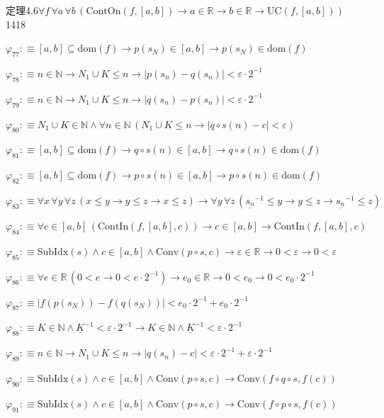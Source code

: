 \begin{fullproof}{定理4.6}{$\forall f\,\forall a\,\forall b\,(\mathrm{ContOn}(f,[a,b]) \to a \in \mathbb{R} \to b \in \mathbb{R} \to \mathrm{UC}(f,[a,b]))$}{1418}
\begin{abbrevlist}
\item $\varphi_{77} :\equiv [a,b] \subseteq \mathrm{dom}(f) \to p(s_{N}) \in [a,b] \to p(s_{N}) \in \mathrm{dom}(f)$
\item $\varphi_{78} :\equiv n \in \mathbb{N} \to N_{1} \cup K \leq n \to \lvert p(s_{n}) - q(s_{n}) \rvert < \varepsilon \cdot 2^{-1}$
\item $\varphi_{79} :\equiv n \in \mathbb{N} \to N_{1} \cup K \leq n \to \lvert q(s_{n}) - p(s_{n}) \rvert < \varepsilon \cdot 2^{-1}$
\item $\varphi_{80} :\equiv N_{1} \cup K \in \mathbb{N} \land \forall n \in \mathbb{N}\,(N_{1} \cup K \leq n \to \lvert q \circ s(n) - c \rvert < \varepsilon)$
\item $\varphi_{81} :\equiv [a,b] \subseteq \mathrm{dom}(f) \to q \circ s(n) \in [a,b] \to q \circ s(n) \in \mathrm{dom}(f)$
\item $\varphi_{82} :\equiv [a,b] \subseteq \mathrm{dom}(f) \to p \circ s(n) \in [a,b] \to p \circ s(n) \in \mathrm{dom}(f)$
\item $\varphi_{83} :\equiv \forall x\,\forall y\,\forall z\,(x \leq y \to y \leq z \to x \leq z) \to \forall y\,\forall z\,(\underline{s_{n}}^{-1} \leq y \to y \leq z \to \underline{s_{n}}^{-1} \leq z)$
\item $\varphi_{84} :\equiv \forall c \in [a,b]\,(\mathrm{ContIn}(f,[a,b],c)) \to c \in [a,b] \to \mathrm{ContIn}(f,[a,b],c)$
\item $\varphi_{85} :\equiv \mathrm{SubIdx}(s) \land c \in [a,b] \land \mathrm{Conv}(p \circ s,c) \to \varepsilon \in \mathbb{R} \to 0 < \varepsilon \to 0 < \varepsilon$
\item $\varphi_{86} :\equiv \forall e \in \mathbb{R}\,(0 < e \to 0 < e \cdot 2^{-1}) \to e_{0} \in \mathbb{R} \to 0 < e_{0} \to 0 < e_{0} \cdot 2^{-1}$
\item $\varphi_{87} :\equiv \lvert f(p(s_{N})) - f(q(s_{N})) \rvert < e_{0} \cdot 2^{-1} + e_{0} \cdot 2^{-1}$
\item $\varphi_{88} :\equiv K \in \mathbb{N} \land \underline{K}^{-1} < \varepsilon \cdot 2^{-1} \to K \in \mathbb{N} \land \underline{K}^{-1} < \varepsilon \cdot 2^{-1}$
\item $\varphi_{89} :\equiv n \in \mathbb{N} \to N_{1} \cup K \leq n \to \lvert q(s_{n}) - c \rvert < \varepsilon \cdot 2^{-1} + \varepsilon \cdot 2^{-1}$
\item $\varphi_{90} :\equiv \mathrm{SubIdx}(s) \land c \in [a,b] \land \mathrm{Conv}(p \circ s,c) \to \mathrm{Conv}(f \circ q \circ s,f(c))$
\item $\varphi_{91} :\equiv \mathrm{SubIdx}(s) \land c \in [a,b] \land \mathrm{Conv}(p \circ s,c) \to \mathrm{Conv}(f \circ p \circ s,f(c))$

\end{abbrevlist}
\end{fullproof}

